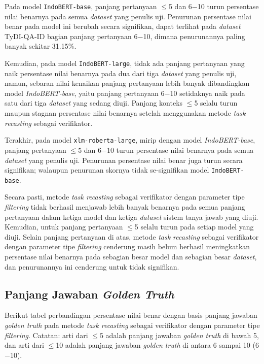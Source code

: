 Pada model \texttt{IndoBERT-base}, panjang pertanyaan $\leq$5 dan 6$-$10 turun persentase nilai benarnya pada semua \emph{dataset} yang penulis uji. Penurunan persentase nilai benar pada model ini berubah secara signifikan, dapat terlihat pada \emph{dataset} TyDI-QA-ID bagian panjang pertanyaan 6$-$10, dimana penurunannya paling banyak sekitar 31.15\%.

Kemudian, pada model \texttt{IndoBERT-large}, tidak ada panjang pertanyaan yang naik persentase nilai benarnya pada dua dari tiga \emph{dataset} yang penulis uji, namun, sebaran nilai kenaikan panjang pertanyaan lebih banyak dibandingkan model \emph{IndoBERT-base}, yaitu panjang pertanyaan  6$-$10 setidaknya naik pada satu dari tiga \emph{dataset} yang sedang diuji. Panjang konteks  $\leq$5 selalu turun maupun stagnan persentase nilai benarnya setelah menggunakan metode \emph{task recasting} sebagai verifikator.

Terakhir, pada model \texttt{xlm-roberta-large}, mirip dengan model \emph{IndoBERT-base}, panjang pertanyaan $\leq$5 dan 6$-$10 turun persentase nilai benarnya pada semua \emph{dataset} yang penulis uji. Penurunan persentase nilai benar juga turun secara signifikan; walaupun penurunan skornya tidak se-signifikan model \texttt{IndoBERT-base}.

Secara pasti, metode \emph{task recasting} sebagai verifikator dengan parameter tipe \emph{filtering} tidak berhasil menjawab lebih banyak benarnya pada semua panjang pertanyaan dalam ketiga model dan ketiga \emph{dataset} sistem tanya jawab yang diuji. Kemudian, untuk panjang pertanyaan $\leq$5 selalu turun pada setiap model yang diuji. Selain panjang pertanyaan di atas, metode \emph{task recasting} sebagai verifikator dengan parameter tipe \emph{filtering} cenderung masih belum berhasil meningkatkan persentase nilai benarnya pada sebagian besar model dan sebagian besar \emph{dataset}, dan penurunannya ini cenderung untuk tidak signifikan.

\subsection{Panjang Jawaban \emph{Golden Truth}}
Berikut tabel perbandingan persentase nilai benar dengan basis panjang jawaban \emph{golden truth} pada metode \emph{task recasting} sebagai verifikator dengan parameter tipe \emph{filtering}. Catatan: arti dari $\leq$5 adalah panjang jawaban \emph{golden truth} di bawah 5, dan arti dari $\leq$10 adalah panjang jawaban \emph{golden truth} di antara 6 sampai 10 (6$-$10).

